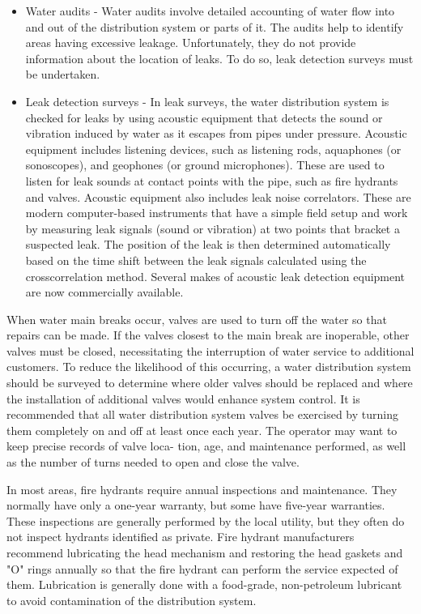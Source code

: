 \documentclass[10pt]{article}
\begin{document}
\begin{itemize}
  \item Water audits - Water audits involve detailed accounting of water flow into and out of the distribution system or parts of it. The audits help to identify areas having excessive leakage. Unfortunately, they do not provide information about the location of leaks. To do so, leak detection surveys must be undertaken.

  \item Leak detection surveys - In leak surveys, the water distribution system is checked for leaks by using acoustic equipment that detects the sound or vibration induced by water as it escapes from pipes under pressure. Acoustic equipment includes listening devices, such as listening rods, aquaphones (or sonoscopes), and geophones (or ground microphones). These are used to listen for leak sounds at contact points with the pipe, such as fire hydrants and valves. Acoustic equipment also includes leak noise correlators. These are modern computer-based instruments that have a simple field setup and work by measuring leak signals (sound or vibration) at two points that bracket a suspected leak. The position of the leak is then determined automatically based on the time shift between the leak signals calculated using the crosscorrelation method. Several makes of acoustic leak detection equipment are now commercially available.

\end{itemize}
When water main breaks occur, valves are used to turn off the water so that repairs can be made. If the valves closest to the main break are inoperable, other valves must be closed, necessitating the interruption of water service to additional customers. To reduce the likelihood of this occurring, a water distribution system should be surveyed to determine where older valves should be replaced and where the installation of additional valves would enhance system control. It is recommended that all water distribution system valves be exercised by turning them completely on and off at least once each year. The operator may want to keep precise records of valve loca- tion, age, and maintenance performed, as well as the number of turns needed to open and close the valve.

In most areas, fire hydrants require annual inspections and maintenance. They normally have only a one-year warranty, but some have five-year warranties. These inspections are generally performed by the local utility, but they often do not inspect hydrants identified as private. Fire hydrant manufacturers recommend lubricating the head mechanism and restoring the head gaskets and "O" rings annually so that the fire hydrant can perform the service expected of them. Lubrication is generally done with a food-grade, non-petroleum lubricant to avoid contamination of the distribution system.
\end{document}
